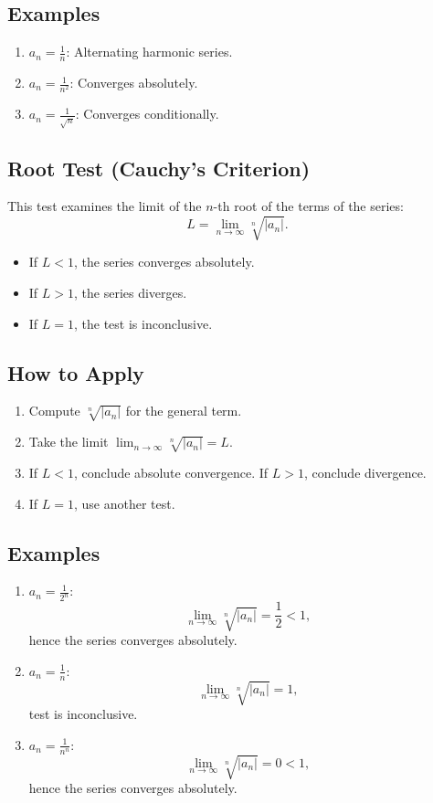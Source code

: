 \documentclass[a4paper, 12pt]{article}
\begin{document}
\subsection*{Examples}
\begin{enumerate}
    \item \(a_n = \frac{1}{n}\): Alternating harmonic series.
    \item \(a_n = \frac{1}{n^2}\): Converges absolutely.
    \item \(a_n = \frac{1}{\sqrt{n}}\): Converges conditionally.
\end{enumerate}

\subsection{Root Test (Cauchy’s Criterion)}
This test examines the limit of the \(n\)-th root of the terms of the series:
\[
L = \lim_{n \to \infty} \sqrt[n]{|a_n|}.
\]
\begin{itemize}
    \item If \(L < 1\), the series converges absolutely.
    \item If \(L > 1\), the series diverges.
    \item If \(L = 1\), the test is inconclusive.
\end{itemize}

\subsection*{How to Apply}
\begin{enumerate}
    \item Compute \(\sqrt[n]{|a_n|}\) for the general term.
    \item Take the limit \(\lim_{n \to \infty} \sqrt[n]{|a_n|} = L\).
    \item If \(L < 1\), conclude absolute convergence. If \(L > 1\), conclude divergence.
    \item If \(L = 1\), use another test.
\end{enumerate}

\subsection*{Examples}
\begin{enumerate}
    \item \(a_n = \frac{1}{2^n}\):
    \[
    \lim_{n \to \infty} \sqrt[n]{|a_n|} = \frac{1}{2} < 1,\]
    hence the series converges absolutely.

    \item \(a_n = \frac{1}{n}\):
    \[
    \lim_{n \to \infty} \sqrt[n]{|a_n|} = 1,\]
    test is inconclusive.

    \item \(a_n = \frac{1}{n^{n}}\):
    \[
    \lim_{n \to \infty} \sqrt[n]{|a_n|} = 0 < 1,\]
    hence the series converges absolutely.
\end{enumerate}
\end{document}
